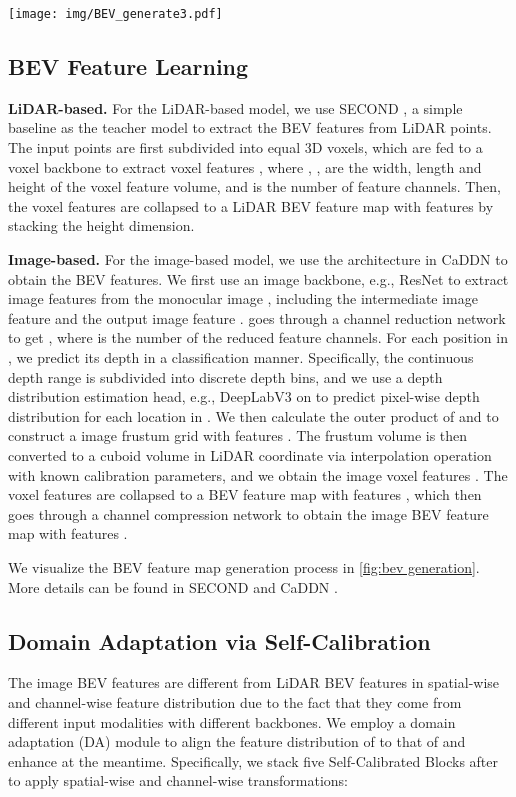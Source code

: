 \documentclass[runningheads]{llncs}
\begin{document}
\begin{figure*}[t]
  \centering
  \texttt{[image: img/BEV\_generate3.pdf]}
  \caption{BEV feature map generation. (a) The LiDAR-based branch. (b) The image-based branch.}
  \label{fig:bev generation}
\end{figure*}

\subsection{BEV Feature Learning}
\textbf{LiDAR-based.} 
For the LiDAR-based model, we use SECOND \cite{second}, a simple baseline as the teacher model to extract the BEV features from LiDAR points.
The input points are first subdivided into equal 3D voxels, which are fed to a voxel backbone to extract voxel features , where , ,  are the width, length and height of the voxel feature volume, and  is the number of feature channels. 
Then, the voxel features  are collapsed to a LiDAR BEV feature map with features  by stacking the height dimension. 

\noindent\textbf{Image-based.} 
For the image-based model, we use the architecture in CaDDN \cite{CADDN} to obtain the BEV features. 
We first use an image backbone, e.g., ResNet \cite{resnet} to extract image features from the monocular image , including the intermediate image feature  and the output image feature .
 goes through a channel reduction network to get , where  is the number of the reduced feature channels.
For each position in , we predict its depth in a classification manner.
Specifically, the continuous depth range  is subdivided into  discrete depth bins, and we use a depth distribution estimation head, e.g., DeepLabV3 \cite{deeplab} on  to predict pixel-wise depth distribution  for each location in .
We then calculate the outer product of  and  to construct a image frustum grid  with features .
The frustum volume is then converted to a cuboid volume in LiDAR coordinate via interpolation operation with known calibration parameters, and we obtain the image voxel features .
The voxel features are collapsed to a BEV feature map with features , which then goes through a channel compression network to obtain the image BEV feature map with features .

We visualize the BEV feature map generation process in \cref{fig:bev generation}. 
More details can be found in SECOND \cite{second} and CaDDN \cite{CADDN}.

\subsection{Domain Adaptation via Self-Calibration}
The image BEV features  are different from LiDAR BEV features  in spatial-wise and channel-wise feature distribution due to the fact that they come from different input modalities with different backbones. 
We employ a domain adaptation (DA) module to align the feature distribution of  to that of  and enhance  at the meantime.
Specifically, we stack five Self-Calibrated Blocks \cite{scnet} after  to apply spatial-wise and channel-wise transformations:
\end{document}
